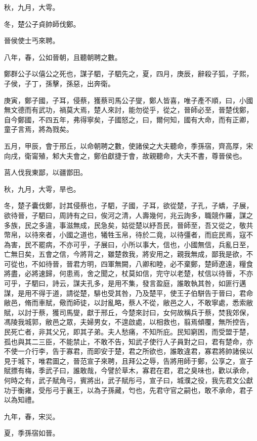 \begin{pinyinscope}
秋，九月，大雩。

冬，楚公子貞帥師伐鄭。

晉侯使士丐來聘。

八年，春，公如晉朝，且聽朝聘之數。

鄭群公子以僖公之死也，謀子駟，子駟先之，夏，四月，庚辰，辭殺子狐，子熙，子侯，子丁，孫擊，孫惡，出奔衛。

庚寅，鄭子國，子耳，侵蔡，獲蔡司馬公子燮，鄭人皆喜，唯子產不順，曰，小國無文德而有武功，禍莫大焉，楚人來討，能勿從乎，從之，晉師必至，晉楚伐鄭，自今鄭國，不四五年，弗得寧矣，子國怒之，曰，爾何知，國有大命，而有正卿，童子言焉，將為戮矣。

五月，甲辰，會于邢丘，以命朝聘之數，使諸侯之大夫聽命，季孫宿，齊高厚，宋向戌，衛甯殖，邾大夫會之，鄭伯獻捷于會，故親聽命，大夫不書，尊晉侯也。

莒人伐我東鄙，以疆鄫田。

秋，九月，大雩，旱也。

冬，楚子囊伐鄭，討其侵蔡也，子駟，子國，子耳，欲從楚，子孔，子蟜，子展，欲待晉，子駟曰，周詩有之曰，俟河之清，人壽幾何，兆云詢多，職競作羅，謀之多族，民之多違，事滋無成，民急矣，姑從楚以紓吾民，晉師至，吾又從之，敬共幣帛，以待來者，小國之道也，犧牲玉帛，待於二竟，以待彊者，而庇民焉，寇不為害，民不罷病，不亦可乎，子展曰，小所以事大，信也，小國無信，兵亂日至，亡無日矣，五會之信，今將背之，雖楚救我，將安用之，親我無成，鄙我是欲，不可從也，不如待晉，晉君方明，四軍無闕，八卿和睦，必不棄鄭，楚師遼遠，糧食將盡，必將速歸，何患焉，舍之聞之，杖莫如信，完守以老楚，杖信以待晉，不亦可乎，子駟曰，詩云，謀夫孔多，是用不集，發言盈庭，誰敢執其咎，如匪行邁謀，是用不得于道，請從楚，騑也受其咎，乃及楚平，使王子伯駢告于晉曰，君命敝邑，脩而車賦，儆而師徒，以討亂略，蔡人不從，敝邑之人，不敢寧處，悉索敝賦，以討于蔡，獲司馬燮，獻于邢丘，今楚來討曰，女何故稱兵于蔡，焚我郊保，馮陵我城郭，敝邑之眾，夫婦男女，不遑啟處，以相救也，翦焉傾覆，無所控告，民死亡者，非其父兄，即其子弟。夫人愁痛，不知所庇。民知窮困，而受盟于楚，孤也與其二三臣，不能禁止，不敢不告，知武子使行人子員對之曰，君有楚命，亦不使一介行李，告于寡君，而即安于楚，君之所欲也，誰敢違君，寡君將帥諸侯以見于城下，唯君圖之，晉范宣子來聘，且拜公之辱，告將用師于鄭，公享之，宣子賦摽有梅，季武子曰，誰敢哉，今譬於草木，寡君在君，君之臭味也，歡以承命，何時之有，武子賦角弓，賓將出，武子賦彤弓，宣子曰，城濮之役，我先君文公獻功于衡雍，受彤弓于襄王，以為子孫藏，匄也，先君守官之嗣也，敢不承命，君子以為知禮。

九年，春，宋災。

夏，季孫宿如晉。


\end{pinyinscope}
